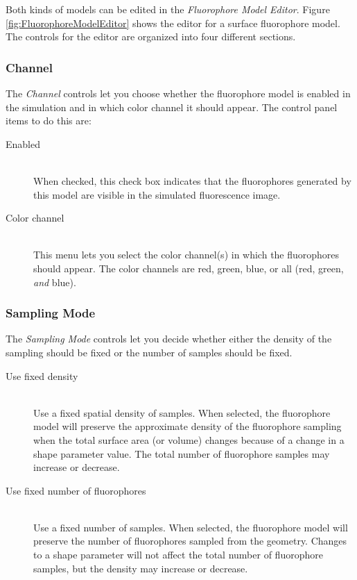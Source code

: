 \documentclass[11pt,titlepage,twoside]{article}
\begin{document}
Both kinds of models can be edited in the \emph{Fluorophore Model Editor}. Figure \ref{fig:FluorophoreModelEditor} shows the editor for a surface fluorophore model. The controls for the editor are organized into four different sections.

\subsubsection{Channel}
\label{sec:Channel}

The \emph{Channel} controls let you choose whether the fluorophore model is enabled in the simulation and in which color channel it should appear. The control panel items to do this are:

\begin{description}

\item[Enabled] \hfill \\
When checked, this check box indicates that the fluorophores generated by this model are visible in the simulated fluorescence image.

\item[Color channel] \hfill \\
This menu lets you select the color channel(s) in which the fluorophores should appear. The color channels are red, green, blue, or all (red, green, \emph{and} blue).

\end{description}

\subsubsection{Sampling Mode}

The \emph{Sampling Mode} controls let you decide whether either the density of the sampling should be fixed or the number of samples should be fixed. 

\begin{description}

\item[Use fixed density] \hfill \\
Use a fixed spatial density of samples. When selected, the fluorophore model will preserve the approximate density of the fluorophore sampling when the total surface area (or volume) changes because of a change in a shape parameter value. The total number of fluorophore samples may increase or decrease.

\item[Use fixed number of fluorophores] \hfill \\
Use a fixed number of samples. When selected, the fluorophore model will preserve the number of fluorophores sampled from the geometry. Changes to a shape parameter will not affect the total number of fluorophore samples, but the density may increase or decrease.

\end{description}
\end{document}
